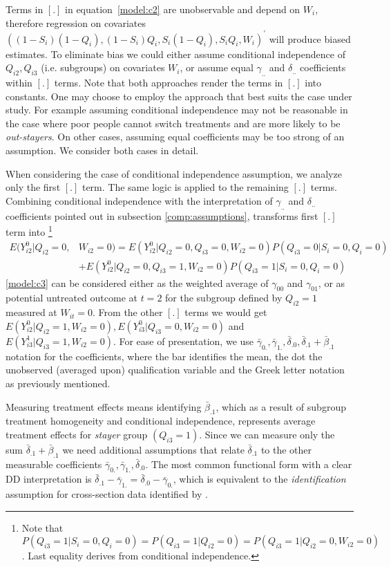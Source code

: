 \documentclass[12pt]{article}
\begin{document}
Terms in $[.]$ in equation~\ref{model:c2} are unobservable and depend on $W_i$, therefore regression on covariates $((1-S_i)(1-Q_{i}),(1-S_i)Q_{i},S_i(1-Q_{i}),S_iQ_{i},W_i)^\prime$ will produce biased estimates. To eliminate bias we could either assume conditional independence of $Q_{i2},Q_{i3}$ (i.e. subgroups) on covariates $W_i$, or assume equal  $\gamma_{..}$ and $\delta_{..}$ coefficients within $[.]$ terms. Note that both approaches render the terms in $[.]$ into constants. One may choose to employ the approach that best suits the case under study. For example assuming conditional independence may not be reasonable in the case where poor people cannot switch treatments and are more likely to be \textit{out-stayers}. On other cases, assuming equal coefficients may be too strong of an assumption. We consider both cases in detail. 

When considering the case of conditional independence assumption, we analyze only the first $[.]$ term. The same logic is applied to the remaining $[.]$ terms. Combining conditional independence with the interpretation of $\gamma_{..}$ and $\delta_{..}$ coefficients pointed out in subsection \ref{comp:assumptions}, transforms first $[.]$ term into \footnote{Note that $P(Q_{i3}=1|S_i=0,Q_i=0)=P(Q_{i3}=1|Q_{i2}=0)=P(Q_{i3}=1|Q_{i2}=0,W_{i2}=0)$. Last equality derives from conditional independence.}
\begin{align*}\label{model:c3}
E(Y_{i2}^0 |Q_{i2}=0,& W_{i2}=0) = E(Y_{i2}^0 |Q_{i2}=0,Q_{i3}=0,W_{i2}=0)P(Q_{i3}=0|S_i=0,Q_i=0) \\
& + E(Y_{i2}^0 |Q_{i2}=0,Q_{i3}=1,W_{i2}=0)P(Q_{i3}=1|S_i=0,Q_i=0) \tag{$C_3$}
\end{align*} 
\ref{model:c3} can be considered either as the weighted average of $\gamma_{00}$ and $\gamma_{01}$, or as potential untreated outcome at $t=2$ for the subgroup defined by $Q_{i2}=1$ measured at $W_{it}=0$. From the other $[.]$ terms we would get $E(Y_{i2}^0 |Q_{i2}=1, W_{i2}=0), E(Y_{i3}^0 |Q_{i3}=0, W_{i2}=0)$ and $E(Y_{i3}^1 |Q_{i3}=1, W_{i2}=0)$. For ease of presentation, we use $\bar{\gamma}_{0.}, \bar{\gamma}_{1.},\bar{\delta}_{.0},\bar{\delta}_{.1} + \bar{\beta}_{.1}$ notation for the coefficients, where the bar identifies the mean, the dot the unobserved (averaged upon) qualification variable and the Greek letter notation as previously mentioned.

Measuring treatment effects means identifying $\bar{\beta}_{.1}$, which as a result of subgroup treatment homogeneity and conditional independence, represents average treatment effects for \textit{stayer} group $(Q_{i3}=1)$. Since we can measure only the sum $\bar{\delta}_{.1} + \bar{\beta}_{.1}$ we need additional assumptions that relate $\bar{\delta}_{.1}$ to the other measurable coefficients $\bar{\gamma}_{0.}, \bar{\gamma}_{1.},\bar{\delta}_{.0}$. The most common functional form with a clear DD interpretation is $\bar{\delta}_{.1}- \bar{\gamma}_{1.} =\bar{\delta}_{.0}-\bar{\gamma}_{0.}$, which is equivalent to the \textit{identification} assumption for cross-section data identified by \cite{lee2006identification}.
\end{document}
